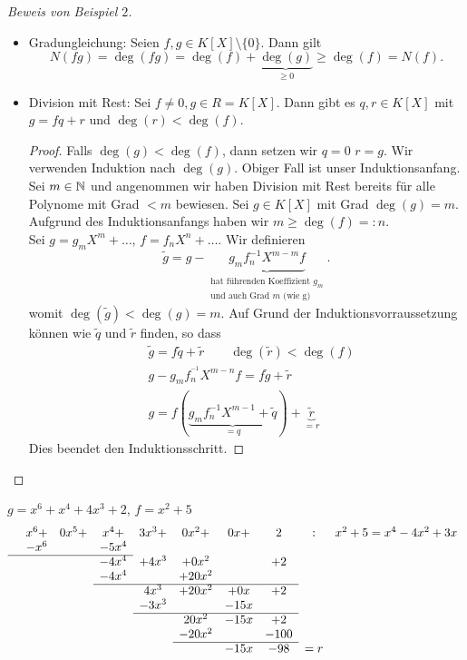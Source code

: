 \begin{proof}[Beweis von Beispiel $2$]\leavevmode
	\begin{itemize}
		\item Gradungleichung: Seien $f,g \in K[X] \setminus \{0\} $. Dann gilt
			\[
				N(fg) = \deg(fg) = \deg(f) + \underbrace{\deg(g)}_{\geq 0} \geq \deg(f) = N(f)
			.\]
		\item Division mit Rest:
			Sei $f \neq 0, g \in R = K[X]$. Dann gibt es $q,r \in K[ X ] $ mit $g =fq + r$ und $\deg(r) < \deg(f)$.
			\begin{proof}
				Falls $\deg(g) < \deg(f)$, dann setzen wir $q=0$ $r=g$.
				Wir verwenden Induktion nach $\deg(g)$. Obiger Fall ist unser Induktionsanfang.\\
				Sei $m \in \mathbb{N}$ und angenommen wir haben Division mit Rest bereits für alle Polynome mit Grad  $< m$ bewiesen.
				Sei $g \in K[X]$ mit Grad $\deg(g) = m$.
				Aufgrund des Induktionsanfangs haben wir $m \geq \deg(f) =: n$.\\
				Sei $g = g_{m} X^{m} + \ldots$, $f = f_{n} X^{n} + \ldots$. Wir definieren 
				\[
					\widetilde{g} = g - \underbrace{g_{m} f_{n}^{-1} X^{m-m} f}_{\substack{\text{hat führenden Koeffizient } g_{m}\\ \text{und auch Grad $m$ (wie g) }}}
				.\] 
				womit $\deg(\widetilde{g}) < \deg(g) = m$. Auf Grund der Induktionsvorraussetzung können wie $\widetilde{q}$ und $\widetilde{r}$ finden, so dass
				\begin{align*}
					&\widetilde{g} = f \widetilde{q} + \widetilde{r} \qquad \deg(\widetilde{r}) < \deg(f)\\
					&g - g_{m} f_{n}^{^{-1}} X^{m-n} f = f \widetilde{g} + \widetilde{r}\\
					&g = f (\underbrace{g_{m} f_{n}^{-1} X^{m-1} + \widetilde{q}}_{=q}) + \underbrace{\widetilde{r}}_{=r}
				\end{align*}
				Dies beendet den Induktionsschritt.
			\end{proof}
	\end{itemize}
\end{proof}

\begin{eg}
	$g = x^{6} + x^{4} + 4x^3 + 2$, $f = x^2  + 5$ 
	\[
		\begin{array}{cccccccccc}
			&x^{6} + &0 x^{5} + &x^{4} + &3 x^3 + &0 x^2+ &0 x + &2 &: &x^2 + 5 = x^{4} - 4 x^{2} + 3x\\
			&-x^{6} & &- 5 x^{4} \\\cline{1-4}
			& & &-4 x^{4} &+ 4x^3 &+ 0 x^2 & &+ 2\\
			& & &-4 x^{4} & &+20x^2\\ \cline{4-8}
			 & & & &4x^3 &+ 20x^2 &+ 0x &+ 2\\
			 & & & &-3x^3 & &- 15x\\ \cline{5-8}
			 & & & & &20x^2 &- 15x &+2\\
			 & & & & &-20x^2 & &- 100\\ \cline{6-8}
			 & & & & & &-15x &- 98 &= r
		\end{array}
	\]
\end{eg}

